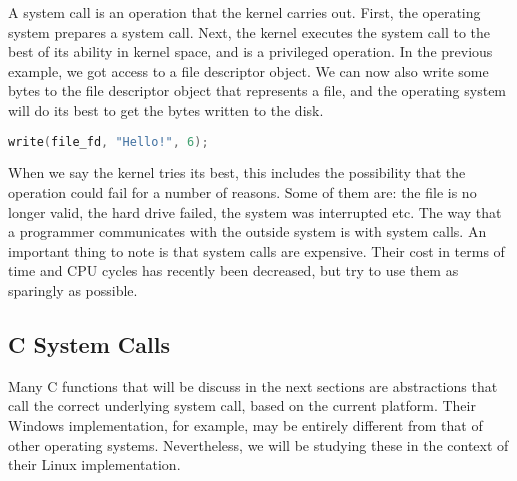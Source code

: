 A system call is an operation that the kernel carries out.
First, the operating system prepares a system call.
Next, the kernel executes the system call to the best of its ability in kernel space, and is a privileged operation.
In the previous example, we got access to a file descriptor object.
We can now also write some bytes to the file descriptor object that represents a file, and the operating system will do its best to get the bytes written to the disk.

\begin{lstlisting}[language=C]
write(file_fd, "Hello!", 6);
\end{lstlisting}

When we say the kernel tries its best, this includes the possibility that the operation could fail for a number of reasons.
Some of them are: the file is no longer valid, the hard drive failed, the system was interrupted etc.
The way that a programmer communicates with the outside system is with system calls.
An important thing to note is that system calls are expensive.
Their cost in terms of time and CPU cycles has recently been decreased, but try to use them as sparingly as possible.

\subsection{C System Calls}

Many C functions that will be discuss in the next sections are abstractions that call the correct underlying system call, based on the current platform. 
Their Windows implementation, for example, may be entirely different from that of other operating systems.
Nevertheless, we will be studying these in the context of their Linux implementation.

